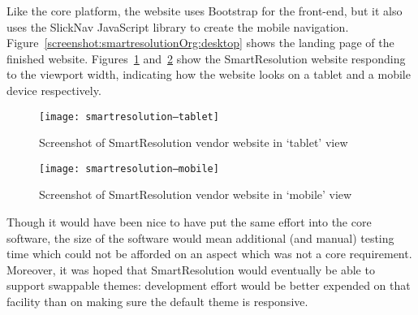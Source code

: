 Like the core platform, the website uses Bootstrap for the front-end, but it also uses the SlickNav JavaScript library to create the mobile navigation. Figure~\ref{screenshot:smartresolutionOrg:desktop} shows the landing page of the finished website. Figures~\ref{screenshot:smartresolutionOrg:tablet} and~\ref{screenshot:smartresolutionOrg:mobile} show the SmartResolution website responding to the viewport width, indicating how the website looks on a tablet and a mobile device respectively.

\begin{figure}[h!]
  \centering
    \ifimages
    \texttt{[image: smartresolution--tablet]}
    \fi
  \caption{Screenshot of SmartResolution vendor website in `tablet' view}
  \label{screenshot:smartresolutionOrg:tablet}
\end{figure}

\begin{figure}[h!]
  \centering
    \ifimages
    \texttt{[image: smartresolution--mobile]}
    \fi
  \caption{Screenshot of SmartResolution vendor website in `mobile' view}
  \label{screenshot:smartresolutionOrg:mobile}
\end{figure}

Though it would have been nice to have put the same effort into the core software, the size of the software would mean additional (and manual) testing time which could not be afforded on an aspect which was not a core requirement. Moreover, it was hoped that SmartResolution would eventually be able to support swappable themes: development effort would be better expended on that facility than on making sure the default theme is responsive.